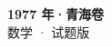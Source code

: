 \documentclass[zihao=-4, a4paper]{ctexart}
\begin{document}
\begin{center}
  {\Large\bfseries 1977 年·青海卷}\\[4pt]
  {\large 数学 · 试题版}
\end{center}
\medskip
{}

\end{document}
